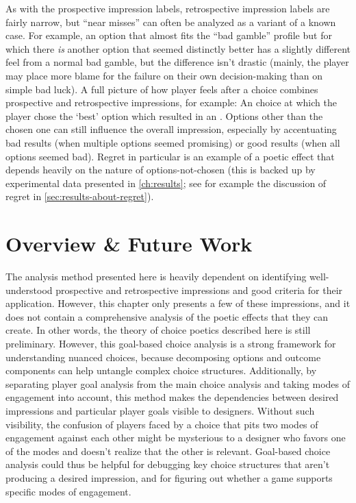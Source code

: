 As with the prospective impression labels, retrospective impression labels are fairly narrow, but ``near misses'' can often be analyzed as a variant of a known case.
%
For example, an option that almost fits the ``bad gamble'' profile but for which there \emph{is} another option that seemed distinctly better has a slightly different feel from a normal bad gamble, but the difference isn't drastic (mainly, the player may place more blame for the failure on their own decision-making than on simple bad luck).
%
A full picture of how player feels after a choice combines prospective and retrospective impressions, for example: An  choice at which the player chose the `best' option which resulted in an .
%
Options other than the chosen one can still influence the overall impression, especially by accentuating bad results (when multiple options seemed promising) or good results (when all options seemed bad).
%
Regret in particular is an example of a poetic effect that depends heavily on the nature of options-not-chosen (this is backed up by experimental data presented in \cref{ch:results}; see for example the discussion of regret in \cref{sec:results-about-regret}).


\section{Overview \& Future Work}

The analysis method presented here is heavily dependent on identifying well-understood prospective and retrospective impressions and good criteria for their application.
%
However, this chapter only presents a few of these impressions, and it does not contain a comprehensive analysis of the poetic effects that they can create.
%
In other words, the theory of choice poetics described here is still preliminary.
%
However, this goal-based choice analysis is a strong framework for understanding nuanced choices, because decomposing options and outcome components can help untangle complex choice structures.
%
Additionally, by separating player goal analysis from the main choice analysis and taking modes of engagement into account, this method makes the dependencies between desired impressions and particular player goals visible to designers.
%
Without such visibility, the confusion of players faced by a choice that pits two modes of engagement against each other might be mysterious to a designer who favors one of the modes and doesn't realize that the other is relevant.
%
Goal-based choice analysis could thus be helpful for debugging key choice structures that aren't producing a desired impression, and for figuring out whether a game supports specific modes of engagement.


